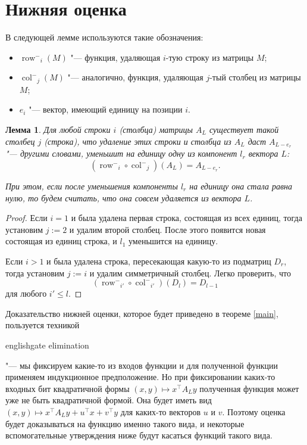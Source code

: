 \documentclass[oneside, a4paper]{article}
\newtheorem{lemma}{Лемма}
\theoremstyle{plain}
\theoremstyle{remark}
\newcommand\rowm{\ensuremath{\operatorname{row}^-}}
\newcommand\colm{\ensuremath{\operatorname{col}^-}}
\begin{document}
\section{Нижняя оценка}
\label{sec_bound}

В следующей лемме используются такие обозначения:
\begin{itemize}
\item $\rowm_i(M)$ "--- функция, удаляющая $i$-тую строку из матрицы $M$;
\item $\colm_j(M)$ "--- аналогично, функция, удаляющая $j$-тый столбец из матрицы $M$;
\item $e_i$ "--- вектор, имеющий единицу на позиции $i$.
\end{itemize}

\begin{lemma} \label{easy}
Для любой строки $i$ (столбца) матрицы $A_L$ существует такой столбец $j$
(строка), что удаление этих строки и столбца из $A_L$ даст $A_{L - e_r}$ "---
другими словами, уменьшит на единицу одну из компонент $l_r$ вектора $L$:
\[
(\rowm_i \circ \colm_j)(A_L) = A_{L - e_r}.
\]

При этом, если после уменьшения компоненты $l_r$ на единицу она стала равна нулю,
то будем считать, что она совсем удаляется из вектора $L$.
\end{lemma}
\begin{proof}
Если $i = 1$ и была удалена первая строка, состоящая из всех единиц, тогда
установим $j := 2$ и удалим второй столбец. После этого появится новая состоящая
из единиц строка, и $l_1$ уменьшится на единицу.

Если $i > 1$ и была удалена строка, пересекающая какую-то из подматриц $D_r$,
тогда установим $j := i$ и удалим симметричный столбец. Легко проверить, что
\[
(\rowm_{i'} \circ \colm_{i'})(D_l) = D_{l-1}
\]
для любого $i' \leq l$.
\end{proof}

Доказательство нижней оценки, которое будет приведено в теореме
\ref{main}, пользуется техникой \begin{foreignlanguage}{english}gate
elimination\end{foreignlanguage} "--- мы фиксируем какие-то из входов функции
и для полученной функции применяем индукционное предположение. Но при
фиксировании каких-то входных бит квадратичной формы $(x, y) \mapsto x^\top A_L
y$ полученная функция может уже не быть квадратичной формой. Она будет иметь
вид $(x, y) \mapsto x^\top A_L y + u^\top x + v^\top y$ для каких-то векторов
$u$ и $v$. Поэтому оценка будет доказываться на функцию именно такого вида, и
некоторые вспомогательные утверждения ниже будут касаться функций такого вида.
\end{document}
